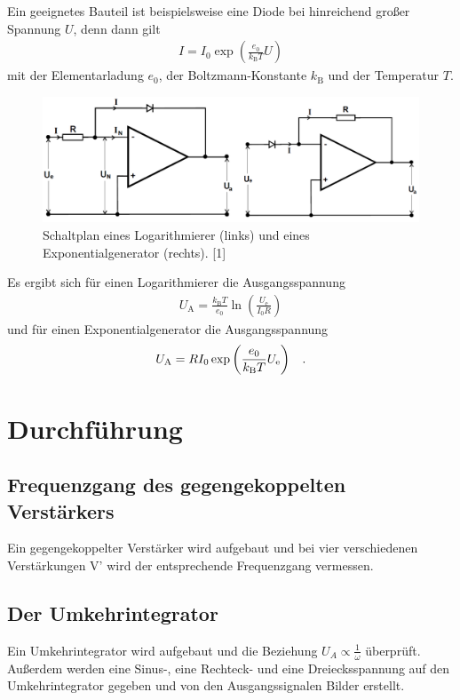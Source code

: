 \documentclass[]{scrartcl}
\begin{document}
Ein geeignetes Bauteil ist beispielsweise eine Diode bei hinreichend großer Spannung $U$, denn dann gilt
\begin{align}
I=I_0 \exp \left(\frac{e_0}{k_\text{B} T}U\right)
\end{align}
mit der Elementarladung $e_0$, der Boltzmann-Konstante $k_\text{B}$ und der Temperatur $T$. 


\begin{figure}[H]
\centering
\includegraphics[width=15cm]{images/schaltplan_explog.png}
\caption{Schaltplan eines Logarithmierer (links) und eines Exponentialgenerator (rechts). [1]}
\label{fig:schalplan_explog}
\end{figure}

Es ergibt sich für einen Logarithmierer die Ausgangsspannung 
\begin{align}
U_\text{A}=\frac{k_\text{B}T}{e_0}\ln \left(\frac{U_\text{e}}{I_0 R}\right)
\end{align}
und für einen Exponentialgenerator die Ausgangsspannung
\begin{align}
U_\text{A}=RI_0\exp \left(\frac{e_0}{k_\text{B} T}U_\text{e}\right)\hspace{0.3cm}\text{.}
\end{align}

\newpage

\section{Durchführung}

\subsection{Frequenzgang des gegengekoppelten Verstärkers}
Ein gegengekoppelter Verstärker wird aufgebaut und bei vier verschiedenen Verstärkungen V' wird der entsprechende Frequenzgang vermessen.

\subsection{Der Umkehrintegrator}
Ein Umkehrintegrator wird aufgebaut und die Beziehung $U_A\propto\frac{1}{\omega}$ überprüft. Außerdem werden eine Sinus-, eine Rechteck- und eine Dreiecksspannung auf den Umkehrintegrator gegeben und von den Ausgangssignalen Bilder erstellt.
\end{document}
